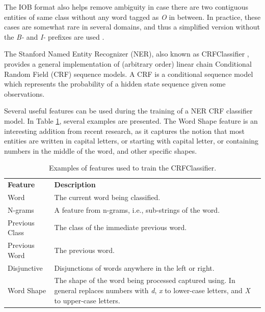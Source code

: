 \documentclass[11pt,a4paper,openright]{memoir}
\begin{document}
The IOB format also helps remove ambiguity in case there are two contiguous entities of same class without any word tagged as \emph{O} in between. In practice, these cases are somewhat rare in several domains, and thus a simplified version without the \emph{B-} and \emph{I-} prefixes are used \cite{Surdeanu:2011:CIE:2021153.2021155}.

The Stanford Named Entity Recognizer (NER), also known as CRFClassifier \cite{Finkel:2005:INI:1219840.1219885}, provides a general implementation of (arbitrary order) linear chain Conditional Random Field (CRF) sequence models. A CRF is a conditional sequence model which represents the probability of a hidden state sequence given some observations.

Several useful features can be used during the training of a NER CRF classifier model. In Table \ref{tab:ner_features}, several examples are presented. The Word Shape feature is an interesting addition from recent research, as it captures the notion that most entities are written in capital letters, or starting with capital letter, or containing numbers in the middle of the word, and other specific shapes.

\begin{table}[!htbp]
  \centering
    \begin{tabular}{ll}
      \textbf{Feature}          & \textbf{Description} \\
      Word                      & The current word being classified.          \\
      N-grams                   & \parbox[t]{9cm}{A feature from n-grams, i.e., sub-strings of the word.} \\
      Previous Class            & The class of the immediate previous word.          \\
      Previous Word             & The previous word.          \\
      Disjunctive               & \parbox[t]{9cm}{Disjunctions of words anywhere in the left or right.} \\
      Word Shape                & \parbox[t]{9cm}{The shape of the word being processed captured using. In general replaces numbers with \emph{d}, \emph{x} to lower-case letters, and \emph{X} to upper-case letters.} \\
    \end{tabular}
  \caption[Possible features to train the CRFClassifier.]{Examples of features used to train the CRFClassifier.}
  \label{tab:ner_features}
\end{table}
\end{document}
